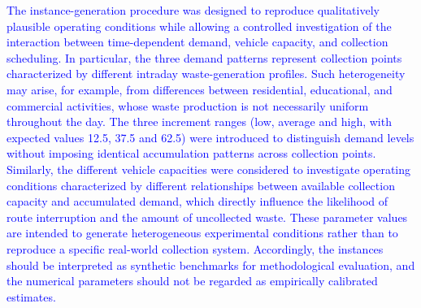 \documentclass[authoryear,preprint,12pt]{elsarticle}
\newcommand{\rev}[1]{\textcolor{blue}{{#1}}}
\begin{document}


\rev{The instance-generation procedure was designed to reproduce qualitatively plausible operating conditions while allowing a controlled investigation of the interaction between time-dependent demand, vehicle capacity, and collection scheduling. In particular, the three demand patterns represent collection points characterized by different intraday waste-generation profiles. Such heterogeneity may arise, for example, from differences between residential, educational, and commercial activities, whose waste production is not necessarily uniform throughout the day. The three increment ranges (low, average and high, with expected values 12.5, 37.5 and 62.5) were introduced to distinguish demand levels without imposing identical accumulation patterns across collection points.
Similarly, the different vehicle capacities were considered to investigate operating conditions characterized by different relationships between available collection capacity and accumulated demand, which directly influence the likelihood of route interruption and the amount of uncollected waste. These parameter values are intended to generate heterogeneous experimental conditions rather than to reproduce a specific real-world collection system. Accordingly, the instances should be interpreted as synthetic benchmarks for methodological evaluation, and the numerical parameters should not be regarded as empirically calibrated estimates.}
\end{document}
